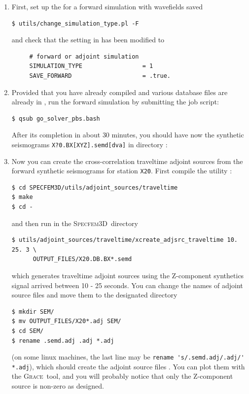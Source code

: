 \documentclass[10pt,fleqn,letterpaper]{article}
\newcommand{\specfem}{\textsc{Specfem3D}}
\newcommand{\grace}{\textsc{Grace}}
\begin{document}
\begin{enumerate}


\item  First, set up the  for a forward simulation with wavefields saved

\begin{lstlisting}
$ utils/change_simulation_type.pl -F
\end{lstlisting}
and check that the setting in  has been modified to
\begin{lstlisting}
     # forward or adjoint simulation
     SIMULATION_TYPE                 = 1
     SAVE_FORWARD                    = .true.
\end{lstlisting}


\item Provided that you have already compiled  and various database files are already in ,
  run the forward simulation by submitting the job script:

\begin{lstlisting}
$ qsub go_solver_pbs.bash
\end{lstlisting}

After its completion in about $30$ minutes,  you should have now the synthetic seismograms \texttt{X?0.BX[XYZ].semd[dva]} in directory :


\item Now you can create the cross-correlation traveltime adjoint sources from the forward synthetic seismograms for station \verb+X20+. First compile the utility :

\begin{lstlisting}
$ cd SPECFEM3D/utils/adjoint_sources/traveltime
$ make
$ cd -
\end{lstlisting}
and then run in the \specfem\ directory
\begin{lstlisting}
$ utils/adjoint_sources/traveltime/xcreate_adjsrc_traveltime 10. 25. 3 \
      OUTPUT_FILES/X20.DB.BX*.semd
\end{lstlisting}
which generates traveltime adjoint sources  using the Z-component synthetics signal arrived between 10 - 25 seconds. You can  change the names of adjoint source files and move them to the designated directory
\begin{lstlisting}
$ mkdir SEM/
$ mv OUTPUT_FILES/X20*.adj SEM/
$ cd SEM/
$ rename .semd.adj .adj *.adj
\end{lstlisting}
(on some linux machines, the last line may be \verb+rename 's/.semd.adj/.adj/' *.adj+), which  should create the adjoint source files . You can plot them with the \grace\ tool, and you will probably notice that only the Z-component source is non-zero as designed.



\end{enumerate}
\end{document}
